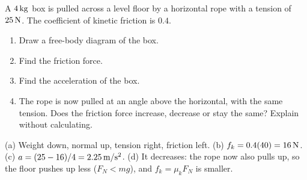\begin{exo}{}
A $4\,\mathrm{kg}$ box is pulled across a level floor by a horizontal rope with a tension of $25\,\mathrm{N}$. The coefficient of kinetic friction is $0.4$.
\begin{enumerate}[label=(\alph*)]
\item Draw a free-body diagram of the box.
\item Find the friction force.
\item Find the acceleration of the box.
\item The rope is now pulled at an angle above the horizontal, with the same tension. Does the friction force increase, decrease or stay the same? Explain without calculating.
\end{enumerate}
\work{5cm}
\begin{solution}
(a) Weight down, normal up, tension right, friction left. \;(b) $f_k=0.4(40)=16\,\mathrm{N}$. \;(c) $a=(25-16)/4=2.25\,\mathrm{m/s^2}$. \;(d) It decreases: the rope now also pulls up, so the floor pushes up less ($F_N<mg$), and $f_k=\mu_kF_N$ is smaller.
\end{solution}
\end{exo}


